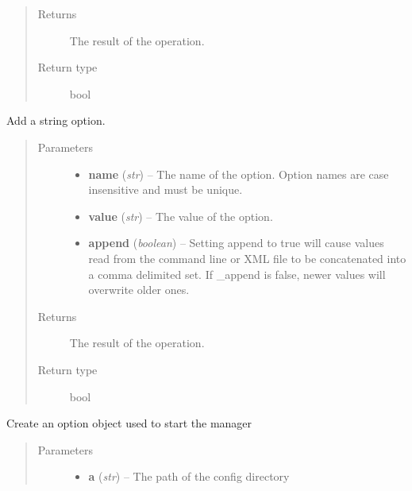 \documentclass[letterpaper,10pt,english]{sphinxmanual}
\begin{document}
\begin{fulllineitems}
\begin{fulllineitems}
\begin{quote}
\begin{description}
\item[{Returns}] \leavevmode
The result of the operation.

\item[{Return type}] \leavevmode
bool

\end{description}\end{quote}

\end{fulllineitems}


\begin{fulllineitems}
\label{libopenzwave:libopenzwave.PyOptions.addOptionString}
Add a string option.
\begin{quote}\begin{description}
\item[{Parameters}] \leavevmode\begin{itemize}
\item {} 
\textbf{name} (\emph{str}) -- The name of the option.  Option names are case insensitive and must be unique.

\item {} 
\textbf{value} (\emph{str}) -- The value of the option.

\item {} 
\textbf{append} (\emph{boolean}) -- Setting append to true will cause values read from the command line
or XML file to be concatenated into a comma delimited set.  If \_append is false,
newer values will overwrite older ones.

\end{itemize}

\item[{Returns}] \leavevmode
The result of the operation.

\item[{Return type}] \leavevmode
bool

\end{description}\end{quote}

\end{fulllineitems}


\begin{fulllineitems}
\label{libopenzwave:libopenzwave.PyOptions.create}
Create an option object used to start the manager
\begin{quote}\begin{description}
\item[{Parameters}] \leavevmode\begin{itemize}
\item {} 
\textbf{a} (\emph{str}) -- The path of the config directory


\end{itemize}
\end{description}
\end{quote}
\end{fulllineitems}
\end{fulllineitems}
\end{document}
